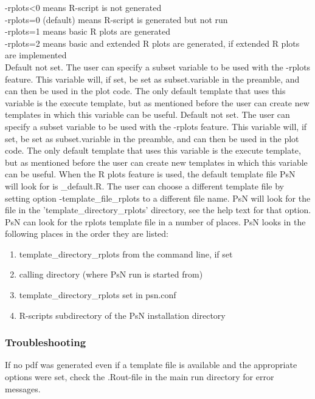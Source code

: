 \begin{optionlist}
-rplots<0 means R-script is not generated\\ 
-rplots=0 (default) means R-script is generated but not run\\ 
-rplots=1 means basic R plots are generated\\													  
-rplots=2 means basic and extended R plots are generated, if extended R plots are implemented\\													  
\nextopt
{}
Default not set. The user can specify a subset variable to be used with the -rplots feature. This variable will, if set, be set as subset.variable in the preamble, and can then be used in the plot code. The only default template that uses this variable is the execute template, but as mentioned before the user can create new templates in which this variable can be useful.
\nextopt
{}
Default not set. The user can specify a subset variable to be used with the -rplots feature. This variable will, if set, be set as subset.variable in the preamble, and can then be used in the plot code.  The only default template that uses this variable is the execute template, but as mentioned before the user can create new templates in which this variable can be useful.
\nextopt
{}
When the R plots feature is used, the default template file PsN will look for is \guidetoolname\_default.R. The user can choose a different template file by setting option -template\_file\_rplots to a different file name. PsN will look for the file in the 'template\_directory\_rplots' directory, see the help text for that option.
\nextopt
{}
PsN can look for the rplots template file in a number of places. PsN looks in the following places in the order they are listed:
\begin{enumerate}
\item template\_directory\_rplots from the command line, if set 
\item calling directory (where PsN run is started from)
\item template\_directory\_rplots set in psn.conf 
\item R-scripts subdirectory of the PsN installation directory
\end{enumerate}
\nextopt

\end{optionlist}

\subsubsection*{Troubleshooting}
If no pdf was generated even if a template file is available and the appropriate options were set, check the .Rout-file in the main run directory for error messages.

